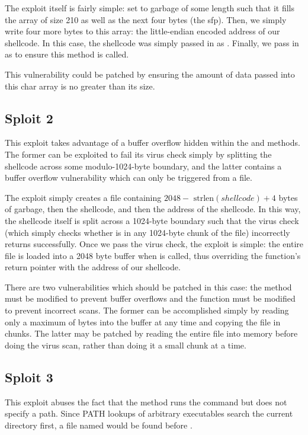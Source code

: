 \documentclass[12pt]{article}
\begin{document}
The exploit itself is fairly simple: set  to garbage of some length such that it fills the array of size 210 as well as the next four bytes (the sfp). Then, we simply write four more bytes to this array: the little-endian encoded address of our shellcode. In this case, the shellcode was simply passed in as . Finally, we pass in  as  to ensure this method is called.

This vulnerability could be patched by ensuring the amount of data passed into this char array is no greater than its size.

\subsection*{Sploit 2}
This exploit takes advantage of a buffer overflow hidden within the  and  methods. The former can be exploited to fail its virus check simply by splitting the shellcode across some modulo-1024-byte boundary, and the latter contains a buffer overflow vulnerability which can only be triggered from a file.

The exploit simply creates a file containing $2048 - \text{ strlen}(shellcode) + 4$ bytes of garbage, then the shellcode, and then the address of the shellcode. In this way, the shellcode itself is split across a 1024-byte boundary such that the virus check (which simply checks whether  is in any 1024-byte chunk of the file) incorrectly returns successfully. Once we pass the virus check, the exploit is simple: the entire file is loaded into a 2048 byte buffer when  is called, thus overriding the function's return pointer with the address of our shellcode.

There are two vulnerabilities which should be patched in this case: the  method must be modified to prevent buffer overflows and the  function must be modified to prevent incorrect scans. The former can be accomplished simply by reading only a maximum of  bytes into the buffer at any time and copying the file in chunks. The latter may be patched by reading the entire file into memory before doing the virus scan, rather than doing it a small chunk at a time.

\subsection*{Sploit 3}
This exploit abuses the fact that the  method runs the command  but does not specify a path. Since PATH lookups of arbitrary executables search the current directory first, a file named  would be found before .
\end{document}
